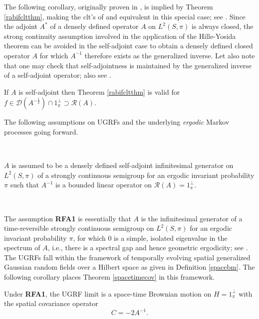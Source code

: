 \documentclass[11pt]{article}
\numberwithin{equation}{section}
\theoremstyle{definition}
\theoremstyle{remark}
\theoremstyle{definition}
\begin{document}
 The following corollary, originally proven 
in \cite{kipvar},
is implied by Theorem \ref{rabifcltthm},
making the clt's of \cite{RBfclt}
and \cite{kipvar} equivalent in this
special case; see \cite{wayfclt}. 
 Since 
the adjoint $ A^*$  of a densely defined 
operator $ A$ on $L^2(S,\pi)$ is always closed,
the
strong continuity assumption involved in the application of the
Hille-Yosida theorem can be
avoided in the self-adjoint case to obtain
a densely defined closed operator $ A$
for which $ A^{-1}$ therefore exists as
the generalized inverse.   
Let also note  that one may check that  self-adjointness is maintained
by the generalized inverse of a self-adjoint operator; 
also see \cite{Majumdar}.

\begin{cor}\label{equiv} If $ A$ is self-adjoint then Theorem \ref{rabifcltthm}
is valid for  $f\in\mathcal{D}({ A^{-\frac{1}{2}}})\cap1_\pi^\perp
\supset\mathcal{R}(A)$. 
\end{cor}


The following assumptions on UGRFs and the underlying
{\it ergodic} Markov processes going forward.
 
\

$ A$ is assumed to be a densely defined self-adjoint infinitesimal
generator  on $L^2(S,\pi)$ of a strongly continuous semigroup
for an ergodic invariant probability $\pi$
such
that $ A^{-1}$ is a bounded linear operator on
$\mathcal{R}(A)=1_\pi^\perp$.

\

The assumption 
{\bf RFA1} is essentially that $ A$ is the
 infinitesimal generator of a time-reversible
 strongly continuous
 semigroup on $L^2(S,\pi)$ for an ergodic invariant
 probability $\pi$, 
  for which $0$ is a simple,
 isolated eigenvalue in the spectrum of $ A$, i.e., 
 there is a spectral gap and hence geometric ergodicity;
 see \cite{RBfclt}. 
The UGRFs
fall within the  framework of temporally evolving
spatial generalized Gaussian random
fields over a Hilbert space as given in Definition \ref{spacebm}.
The following corollary places Theorem \ref{spacetimecov} 
in this framework. 
\begin{cor}\label{kcylcor}
 Under {\bf RFA1}, 
the UGRF limit is a space-time Brownian motion on $H=1_\pi^\perp$
with the spatial covariance operator 
\begin{equation}
C = -2 A^{-1}.
\end{equation}
\end{cor}
 
\end{document}
